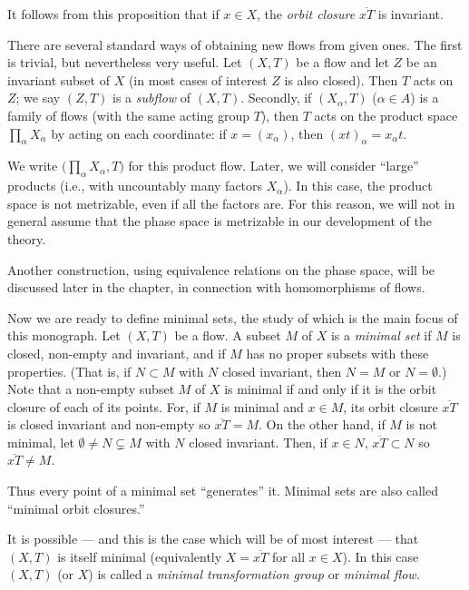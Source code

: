 It follows from this proposition that if $x \in X$, the \emph{orbit closure} $\overline{xT}$ is invariant.

There are several standard ways of obtaining new flows from given ones. The first is trivial, but nevertheless very useful. Let $(X,T)$ be a flow and let $Z$ be an invariant subset of $X$ (in most cases of interest $Z$ is also closed). Then $T$ acts on $Z$; we say $(Z,T)$ is a \emph{subflow} of $(X,T)$. Secondly, if $(X_\alpha, T)$ ($\alpha \in A$) is a family of flows (with the same acting group $T$), then $T$ acts on the product space $\prod_\alpha X_\alpha$ by acting on each coordinate: if $x = (x_\alpha)$, then $(xt)_\alpha = x_\alpha t$.


We write $\bigl(\prod_\alpha X_\alpha, T\bigr)$ for this product flow. Later, we will consider ``large'' products (i.e., with uncountably many factors $X_\alpha$). In this case, the product space is not metrizable, even if all the factors are. For this reason, we will not in general assume that the phase space is metrizable in our development of the theory.

Another construction, using equivalence relations on the phase space, will be discussed later in the chapter, in connection with homomorphisms of flows.



Now we are ready to define minimal sets, the study of which is the main focus of this monograph.
Let $(X,T)$ be a flow. A subset $M$ of $X$ is a \emph{minimal set} if $M$ is closed, non-empty and invariant, and if $M$ has no proper subsets with these properties. (That is, if $N \subset M$ with $N$ closed invariant, then $N = M$ or $N = \emptyset$.) Note that a non-empty subset $M$ of $X$ is minimal if and only if it is the orbit closure of each of its points. For, if $M$ is minimal and $x \in M$, its orbit closure $\overline{xT}$ is closed invariant and non-empty so $\overline{xT} = M$. On the other hand, if $M$ is not minimal, let $\emptyset \neq N \subsetneq M$ with $N$ closed invariant. Then, if $x \in N$, $\overline{xT} \subset N$ so $\overline{xT} \ne M$.


Thus every point of a minimal set “generates” it. Minimal sets are also called “minimal orbit closures.”

It is possible — and this is the case which will be of most interest — that $(X,T)$ is itself minimal (equivalently $X = \overline{xT}$ for all $x \in X$). In this case $(X,T)$ (or $X$) is called a \emph{minimal transformation group} or \emph{minimal flow.}

